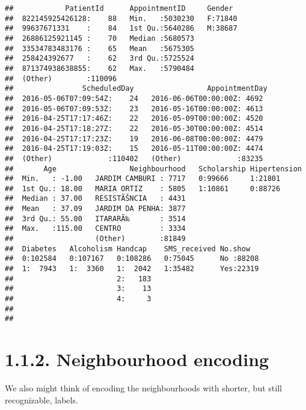 \documentclass[]{article}
\newenvironment{Shaded}{\begin{snugshade}}{\end{snugshade}}
\newcommand{\KeywordTok}[1]{\textcolor[rgb]{0.13,0.29,0.53}{\textbf{#1}}}
\newcommand{\StringTok}[1]{\textcolor[rgb]{0.31,0.60,0.02}{#1}}
\newcommand{\CommentTok}[1]{\textcolor[rgb]{0.56,0.35,0.01}{\textit{#1}}}
\newcommand{\OperatorTok}[1]{\textcolor[rgb]{0.81,0.36,0.00}{\textbf{#1}}}
\newcommand{\NormalTok}[1]{#1}
\begin{document}
\begin{verbatim}
##            PatientId      AppointmentID     Gender   
##  822145925426128:    88   Min.   :5030230   F:71840  
##  99637671331    :    84   1st Qu.:5640286   M:38687  
##  26886125921145 :    70   Median :5680573            
##  33534783483176 :    65   Mean   :5675305            
##  258424392677   :    62   3rd Qu.:5725524            
##  871374938638855:    62   Max.   :5790484            
##  (Other)        :110096                              
##                ScheduledDay                 AppointmentDay 
##  2016-05-06T07:09:54Z:    24   2016-06-06T00:00:00Z: 4692  
##  2016-05-06T07:09:53Z:    23   2016-05-16T00:00:00Z: 4613  
##  2016-04-25T17:17:46Z:    22   2016-05-09T00:00:00Z: 4520  
##  2016-04-25T17:18:27Z:    22   2016-05-30T00:00:00Z: 4514  
##  2016-04-25T17:17:23Z:    19   2016-06-08T00:00:00Z: 4479  
##  2016-04-25T17:19:03Z:    15   2016-05-11T00:00:00Z: 4474  
##  (Other)             :110402   (Other)             :83235  
##       Age                 Neighbourhood   Scholarship Hipertension
##  Min.   : -1.00   JARDIM CAMBURI : 7717   0:99666     1:21801     
##  1st Qu.: 18.00   MARIA ORTIZ    : 5805   1:10861     0:88726     
##  Median : 37.00   RESISTÃŠNCIA   : 4431                           
##  Mean   : 37.09   JARDIM DA PENHA: 3877                           
##  3rd Qu.: 55.00   ITARARÃ‰       : 3514                           
##  Max.   :115.00   CENTRO         : 3334                           
##                   (Other)        :81849                           
##  Diabetes   Alcoholism Handcap    SMS_received No.show    
##  0:102584   0:107167   0:108286   0:75045      No :88208  
##  1:  7943   1:  3360   1:  2042   1:35482      Yes:22319  
##                        2:   183                           
##                        3:    13                           
##                        4:     3                           
##                                                           
## 
\end{verbatim}

\section{1.1.2. Neighbourhood encoding}\label{neighbourhood-encoding}

We also might think of encoding the neighbourhoods with shorter, but
still recognizable, labels.

\begin{Shaded}
\end{Shaded}
\end{document}
